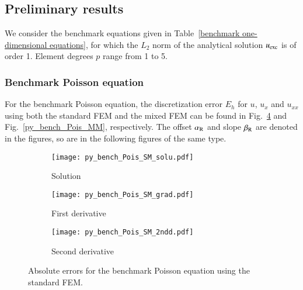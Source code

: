 \documentclass[review,3p]{elsarticle}
\begin{document}

\subsection{Preliminary results}		\label{section_preliminary_results}

We consider the benchmark equations given in Table~\ref{benchmark one-dimensional equations}, for which the $L_2$ norm of the analytical solution $u_{\rm exc}$ is of order 1. Element degrees $p$ range from 1 to 5.


\subsubsection{Benchmark Poisson equation}

For the benchmark Poisson equation, the discretization error $E_h$ for $u$, $u_x$ and $u_{xx}$ using both the standard FEM and the mixed FEM can be found in Fig.~\ref{py_bench_Pois_SM} and Fig.~\ref{py_bench_Pois_MM}, respectively. The offset $\alpha_{\rm R}$ and slope $\beta_{\rm R}$ are denoted in the figures, so are in the following figures of the same type.

\begin{figure}[!ht]
    \begin{subfigure}{5.5cm}
        \texttt{[image: py\_bench\_Pois\_SM\_solu.pdf]}			%
        \caption{Solution}
        \label{py_bench_Pois_SM_solu}
    \end{subfigure}
    \hspace{-0.2cm}
    \begin{subfigure}{5.5cm}
        \texttt{[image: py\_bench\_Pois\_SM\_grad.pdf]}
        \caption{First derivative}
        \label{py_bench_Pois_SM_grad}
    \end{subfigure}
    \hspace{-0.2cm}
    \begin{subfigure}{5.5cm}
        \texttt{[image: py\_bench\_Pois\_SM\_2ndd.pdf]}
        \caption{Second derivative}
        \label{py_bench_Pois_SM_2ndd}
    \end{subfigure}
\caption{Absolute errors for the benchmark Poisson equation using the standard FEM.}
\label{py_bench_Pois_SM}
\end{figure}
\end{document}
